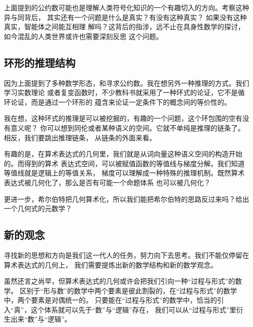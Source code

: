 \documentclass[a4paper,12pt]{article}
\numberwithin{problem}{section}
\numberwithin{definition}{section}
\numberwithin{lemma}{section}
\numberwithin{proposition}{section}
\numberwithin{theorem}{section}
\numberwithin{grammar}{section}
\numberwithin{program}{section}
\numberwithin{convention}{section}
\numberwithin{corollary}{section}
\begin{document}
上面提到的公约数可能也是理解人类符号化知识的一个有趣切入的方向。考察这种异与同背后，
其实还有一个问题是什么是真实？有没有这种真实？ 如果没有这种真实，智能体之间能互相理
解吗？这背后的指涉，远不止在具身性数学的探讨，如今混乱的人类世界或许也需要深刻反思
这个问题。

\subsection{环形的推理结构}

因为上面提到了多种数学形态，和寻求公约数。我在想另外一种推理的方式。我们学习实数理论
或者复变函数时，不少教科书就采用了一种环式的论证，它不是循环论证，而是通过一个环形的
蕴含来论证一定条件下的概念间的等价性的。

我在想，这种环式的推理是可以被挖掘的，有趣的一个问题，这个环包围的空有没有意义呢？
你可以想到同伦或者某种语义的空间。它就不单纯是推理的链条了。相反，我们要跳出推理链条，
从链条的外面来看。

有趣的是，在算术表达式的几何里，我们就是从词向量这种语义空间的构造开始的。而得到的算术
表达式空间，可以被赋值函数的等值线与梯度分解。我们知道等值线就是逻辑上的等值关系，
梯度可以理解成一种特殊的推理机制。既然算术表达式被几何化了，那么是否有可能一个命题体系
也可以被几何化？

更进一步，希尔伯特把几何算术化，所以我们能把希尔伯特的思路反过来吗？给出一个几何式的元数学？

\subsection{新的观念}

寻找新的思想和方向是我们这一代人的任务，努力向下去思考。我们不能仅停留在算术表达式的几何上，
我们需要提炼出新的数学结构和新的数学观念。

虽然还言之尚早，但算术表达式的几何或许会把我们引向一种“过程与形式”的数学。
区别于“形与数”的数学中两个要素是彼此割裂的，在“过程与形式”的数学中，两个要素是对偶统一的。
只要能在“过程与形式”的数学中，恰当的引入“真”，这个体系就可以先于“数”与“逻辑”存在，
我们可以从“过程与形式”里衍生出来“数”与“逻辑”。
\end{document}
